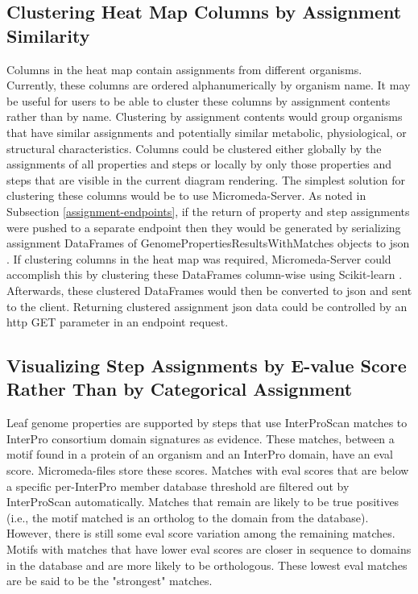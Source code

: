 \subsection{Clustering Heat Map Columns by Assignment Similarity}

Columns in the heat map contain assignments from different organisms. Currently, these columns are ordered alphanumerically by organism name. It may be useful for users to be able to cluster these columns by assignment contents rather than by name. Clustering by assignment contents would group organisms that have similar assignments and potentially similar metabolic, physiological, or structural characteristics. Columns could be clustered either globally by the assignments of all properties and steps or locally by only those properties and steps that are visible in the current diagram rendering. The simplest solution for clustering these columns would be to use Micromeda-Server. As noted in Subsection \ref{assignment-endpoints}, if the return of property and step assignments were pushed to a separate endpoint then they would be generated by serializing assignment DataFrames of GenomePropertiesResultsWithMatches objects to \gls{json} \cite{bray2014rfc}. If clustering columns in the heat map was required, Micromeda-Server could accomplish this by clustering these DataFrames column-wise using Scikit-learn \cite{pedregosa2011scikit}. Afterwards, these clustered DataFrames would then be converted to \gls{json} and sent to the client. Returning clustered assignment \gls{json} data could be controlled by an \gls{http} GET parameter in an endpoint request.

\subsection{Visualizing Step Assignments by E-value Score Rather Than by Categorical Assignment} \label{interface-e-value}

Leaf genome properties are supported by steps that use InterProScan matches to InterPro consortium domain signatures as evidence. These matches, between a motif found in a protein of an organism and an InterPro domain, have an \gls{eval} score. Micromeda-files store these scores. Matches with \gls{eval} scores that are below a specific per-InterPro member database threshold are filtered out by InterProScan automatically. Matches that remain are likely to be true positives (i.e., the motif matched is an ortholog to the domain from the database). However, there is still some \gls{eval} score variation among the remaining matches. Motifs with matches that have lower \gls{eval} scores are closer in sequence to domains in the database and are more likely to be orthologous. These lowest \gls{eval} matches are be said to be the "strongest" matches.

